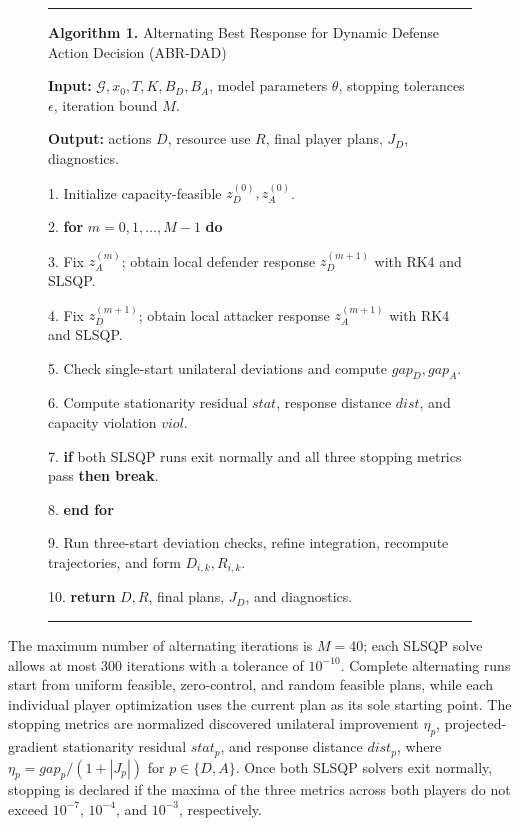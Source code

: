 \documentclass[conference,letterpaper]{IEEEtran}
\begin{document}
\begin{figure}[t]
\centering
\begin{minipage}{\columnwidth}
\hrule\vspace{2pt}
{\footnotesize\textbf{Algorithm 1.} Alternating Best Response for Dynamic Defense Action Decision (ABR-DAD)}\par\vspace{2pt}
{\footnotesize
\textbf{Input:} $\mathcal G,x_0,T,K,B_D,B_A$, model parameters $\theta$, stopping tolerances $\epsilon$, iteration bound $M$.\par
\textbf{Output:} actions $D$, resource use $R$, final player plans, $J_D$, diagnostics.\par
1. Initialize capacity-feasible $z_D^{(0)},z_A^{(0)}$.\par
2. \textbf{for} $m=0,1,\ldots,M-1$ \textbf{do}\par
3. \quad Fix $z_A^{(m)}$; obtain local defender response $z_D^{(m+1)}$ with RK4 and SLSQP.\par
4. \quad Fix $z_D^{(m+1)}$; obtain local attacker response $z_A^{(m+1)}$ with RK4 and SLSQP.\par
5. \quad Check single-start unilateral deviations and compute $gap_D,gap_A$.\par
6. \quad Compute stationarity residual $stat$, response distance $dist$, and capacity violation $viol$.\par
7. \quad \textbf{if} both SLSQP runs exit normally and all three stopping metrics pass \textbf{then break}.\par
8. \textbf{end for}\par
9. Run three-start deviation checks, refine integration, recompute trajectories, and form $D_{i,k},R_{i,k}$.\par
10. \textbf{return} $D,R$, final plans, $J_D$, and diagnostics.
}\vspace{3pt}\hrule
\end{minipage}
\end{figure}

The maximum number of alternating iterations is $M=40$; each SLSQP solve allows at most 300 iterations with a tolerance of $10^{-10}$. Complete alternating runs start from uniform feasible, zero-control, and random feasible plans, while each individual player optimization uses the current plan as its sole starting point. The stopping metrics are normalized discovered unilateral improvement $\eta_p$, projected-gradient stationarity residual $stat_p$, and response distance $dist_p$, where $\eta_p=gap_p/(1+|J_p|)$ for $p\in\{D,A\}$. Once both SLSQP solvers exit normally, stopping is declared if the maxima of the three metrics across both players do not exceed $10^{-7}$, $10^{-4}$, and $10^{-3}$, respectively. 
\end{document}
